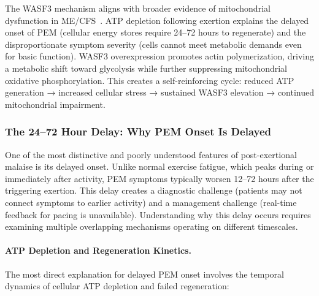 The WASF3 mechanism aligns with broader evidence of mitochondrial dysfunction in ME/CFS~\cite{Syed2025}. ATP depletion following exertion explains the delayed onset of PEM (cellular energy stores require 24--72 hours to regenerate) and the disproportionate symptom severity (cells cannot meet metabolic demands even for basic function). WASF3 overexpression promotes actin polymerization, driving a metabolic shift toward glycolysis while further suppressing mitochondrial oxidative phosphorylation. This creates a self-reinforcing cycle: reduced ATP generation → increased cellular stress → sustained WASF3 elevation → continued mitochondrial impairment.

\subsubsection{The 24--72 Hour Delay: Why PEM Onset Is Delayed}

One of the most distinctive and poorly understood features of post-exertional malaise is its delayed onset. Unlike normal exercise fatigue, which peaks during or immediately after activity, PEM symptoms typically worsen 12--72 hours after the triggering exertion. This delay creates a diagnostic challenge (patients may not connect symptoms to earlier activity) and a management challenge (real-time feedback for pacing is unavailable). Understanding why this delay occurs requires examining multiple overlapping mechanisms operating on different timescales.

\paragraph{ATP Depletion and Regeneration Kinetics.}

The most direct explanation for delayed PEM onset involves the temporal dynamics of cellular ATP depletion and failed regeneration:

